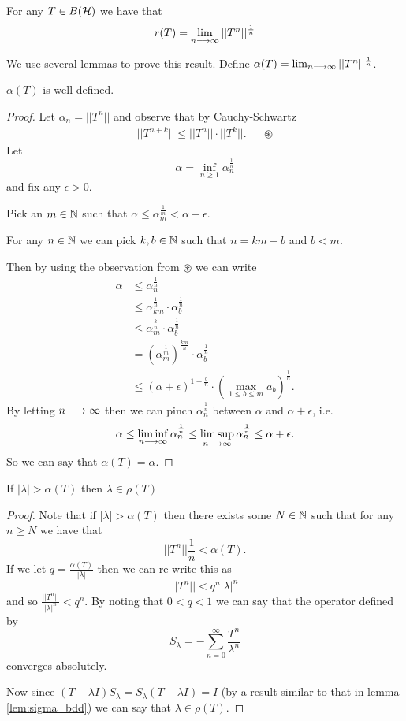 \documentclass{unswmaths}
\begin{document}
\begin{theorem}
	\label{thm:spec_rad}
	For any $ T \in B(\mathcal{H}) $ we have that 
	$$
		r(T) = \lim_{n \longrightarrow \infty} ||T^n||^\frac{1}{n}
	$$
\end{theorem}
We use several lemmas to prove this result.
Define $ \alpha(T) = \lim_{n \longrightarrow \infty}  ||T^n ||^\frac{1}{n} $.
\begin{lemma}
	$ \alpha(T) $ is well defined.
\end{lemma}
\begin{proof}
	Let $ \alpha_n = ||T^n|| $ and observe that by Cauchy-Schwartz
	\begin{align*}
		||T^{n+k} || \leq ||T^n|| \cdot ||T^k||.	& & \circledast
	\end{align*}
	Let $$ \alpha = \inf_{n \geq 1} \alpha^\frac{1}{n}_n $$ and fix any $ \epsilon > 0 $.
	
	Pick an $ m \in \mathbb{N} $ such that $ \alpha\leq \alpha_m^\frac{1}{m}< \alpha + \epsilon $.
	
	For any $ n \in \mathbb{N} $ we can pick $ k, b \in \mathbb{N} $ such that $ n = km + b $ and $ b < m $.
	
	Then by using the observation from $ \circledast $ we can write 
	\begin{align*}
		\alpha &\leq \alpha_{n}^\frac{1}{n} \\
			&\leq \alpha_{km}^\frac{1}{n} \cdot \alpha_{b}^\frac{1}{n} \\
			&\leq \alpha_{m}^\frac{k}{n} \cdot \alpha_{b}^\frac{1}{n} \\
			&= \left(\alpha_m^\frac{1}{m} \right)^\frac{km}{n} \cdot \alpha_b^\frac{1}{n} \\
			&\leq (\alpha + \epsilon)^{1 - \frac{b}{n}} \cdot \left( \max_{1 \leq b \leq m} a_b\right)^\frac{1}{n}.
	\end{align*}
	By letting $ n \longrightarrow \infty $ then we can pinch $ \alpha_{n}^\frac{1}{n} $ between $ \alpha $ and $ \alpha + \epsilon $,
	i.e. 
	$$
		\alpha \leq \liminf_{n \longrightarrow \infty} \alpha_n^\frac{1}{n} \leq \limsup_{n \longrightarrow \infty} \alpha_n^\frac{1}{n} \leq \alpha + \epsilon.
	$$
	So we can say that $ \alpha(T) = \alpha $.
\end{proof}
\begin{lemma}
	\label{lem:lambda_alpha_rho}
	If $ |\lambda| > \alpha(T) $ then $ \lambda \in \rho(T) $
\end{lemma}
\begin{proof}
	Note that
	if $ | \lambda | > \alpha(T) $ then there exists some $ N \in \mathbb{N} $ such that for any $ n \geq N $ we have that
	$$ 
		|| T^n ||\frac{1}{n} < \alpha(T).
	$$
	If we let $ q = \frac{\alpha(T)}{|\lambda|} $  then we can re-write this as
	$$
		||T^n|| < q^n |\lambda|^n 
	$$
	and so $ \frac{||T^n||}{|\lambda|^n} < q^n $.
	By noting that $ 0 < q < 1 $ we can say that the operator defined by
	$$ S_\lambda = - \sum_{n=0}^\infty \frac{T^n}{\lambda^n} $$
	converges absolutely.
	
	Now since $ (T-\lambda I) S_\lambda = S_\lambda (T - \lambda I) = I $ (by a result similar to that in lemma \ref{lem:sigma_bdd})
	we can say that $ \lambda \in \rho(T) $.
\end{proof}
\end{document}
